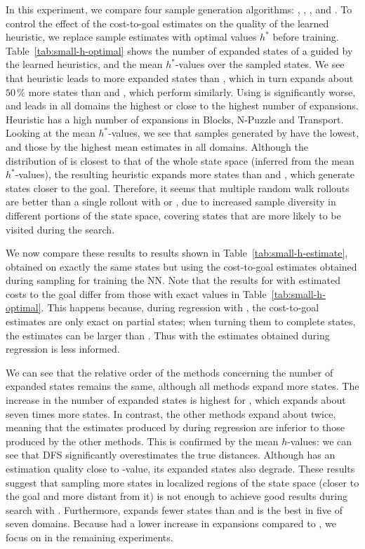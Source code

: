 In this experiment, we compare four sample generation algorithms: \bfs, \dfs, \rw, and \bfsrw. To control the effect of the cost-to-goal estimates on the quality of the learned heuristic, we replace sample estimates with optimal values $h^{*}$ before training.  Table~\ref{tab:small-h-optimal} shows the number of expanded states of a \gbfs guided by the learned heuristics, and the mean $h^{*}$-values over the sampled states. We see that heuristic \hnnbfs leads to more expanded states than \hnndfs, which in turn expands about $50\,\%$ more states than \hnnrw and \hnnbfsrw, which perform similarly. Using \hnnbfs is significantly worse, and leads in all domains the highest or close to the highest number of expansions. Heuristic \hnndfs has a high number of expansions in Blocks, N-Puzzle and Transport. Looking at the mean $h^{*}$-values, we see that samples generated by \bfs have the lowest, and those by \dfs the highest mean estimates in all domains. Although the distribution of \dfs is closest to that of the whole state space (inferred from the mean $h^{*}$-values), the resulting heuristic expands more states than \rw and \bfsrw, which generate states closer to the goal. Therefore, it seems that multiple random walk rollouts are better than a single rollout with \bfs or \dfs, due to increased sample diversity in different portions of the state space, covering states that are more likely to be visited during the search.



We now compare these results to results shown in Table~\ref{tab:small-h-estimate}, obtained on exactly the same states but using the cost-to-goal estimates obtained during sampling for training the NN. Note that the results for \bfs with estimated costs to the goal differ from those with exact values in Table~\ref{tab:small-h-optimal}. This happens because, during regression with \bfs, the cost-to-goal estimates are only exact on partial states; when turning them to complete states, the estimates can be larger than \hstar. Thus \hnnbfs with the estimates obtained during regression is less informed.

We can see that the relative order of the methods concerning the number of expanded states remains the same, although all methods expand more states. The increase in the number of expanded states is highest for \hnndfs, which expands about seven times more states. In contrast, the other methods expand about twice, meaning that the estimates produced by \dfs during regression are inferior to those produced by the other methods. This is confirmed by the mean $h$-values: we can see that DFS significantly overestimates the true distances. Although \bfs has an estimation quality close to \hstar-value, its expanded states also degrade. These results suggest that sampling more states in localized regions of the state space (\bfs closer to the goal and \dfs more distant from it) is not enough to achieve good results during search with \gbfs.
Furthermore, \hnnbfsrw expands fewer states than \hnnrw and is the best in five of seven domains. Because \hnnbfsrw had a lower increase in expansions compared to \hnnrw, we focus on \bfsrw in the remaining experiments.


